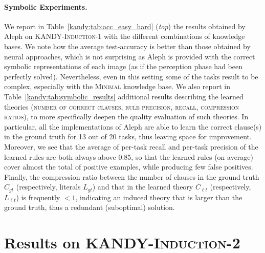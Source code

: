 \paragraph{Symbolic Experiments.}
We report in Table~\ref{kandy:tab:acc_easy_hard} ({\it top}) the results obtained by Aleph on \textsc{KANDY-Induction-1} with the different combinations of knowledge bases. We note how the average test-accuracy is better than those obtained by neural approaches, which is not surprising as Aleph is provided with the correct symbolic representations of each image (as if the perception phase had been perfectly solved). Nevertheless, even in this setting some of the tasks result to be complex, especially with the \textsc{Minimal} knowledge base. We also report in Table~\ref{kandy:tab:symbolic_results} additional results describing the learned theories (\textsc{number of correct clauses}, \textsc{rule precision}, \textsc{recall}, \textsc{compression ratios}), to more specifically deepen the quality evaluation of such theories. In particular, all the implementations of Aleph are able to learn the correct clause(s) in the ground truth for 13 out of 20 tasks, thus leaving space for improvement. Moreover, we see that the average of per-task recall and per-task precision of the learned rules are both always above 0.85, so that the learned rules (on average) cover almost the total of positive examples, while producing few false positives.
%
Finally, the compression ratio between the number of clauses in the ground truth $C_{gt}$ (respectively, literals $L_{gt}$) and that in the learned theory $C_{\ell t}$ (respectively, $L_{\ell t}$) is frequently $< 1$, indicating an induced theory that is larger than the ground truth, thus a redundant (suboptimal) solution.

\section{Results on \textsc{KANDY-Induction-2}}
